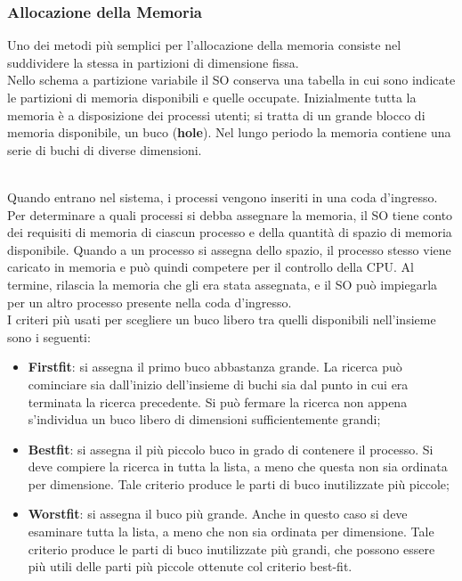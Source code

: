\documentclass{article}
\begin{document}
			\subsubsection{Allocazione della Memoria}
				Uno dei metodi più semplici per l’allocazione della memoria consiste nel suddividere la stessa in partizioni di dimensione fissa.
				\\Nello schema a partizione variabile il SO conserva una tabella in cui sono indicate le partizioni di memoria disponibili e quelle occupate. Inizialmente
				tutta la memoria è a disposizione dei processi utenti; si tratta di un grande blocco di memoria disponibile, un buco (\textbf{hole}). Nel lungo periodo la memoria contiene una serie di buchi di diverse dimensioni.
				\begin{figure}[ht!]
				\end{figure}
				\\Quando entrano nel sistema, i processi vengono inseriti in una coda d’ingresso. Per determinare a quali processi si debba assegnare la memoria, il SO tiene conto dei requisiti di memoria di ciascun processo e della quantità di spazio di
				memoria disponibile. Quando a un processo si assegna dello spazio, il processo stesso viene caricato in memoria e può quindi competere per il controllo della CPU. Al termine, rilascia la memoria che gli era stata assegnata, e il SO può impiegarla per un altro processo presente nella coda d’ingresso.
				\\I criteri più usati per scegliere un buco libero tra quelli disponibili nell’insieme sono i seguenti:
				\begin{itemize}
					\item \textbf{Firstfit}: si assegna il primo buco abbastanza grande. La ricerca può cominciare sia dall’inizio dell’insieme di buchi sia dal punto in cui era terminata la ricerca precedente. Si può fermare la ricerca non appena s’individua un buco libero di dimensioni sufficientemente grandi;
					\item \textbf{Bestfit}: si assegna il più piccolo buco in grado di contenere il processo. Si deve
					compiere la ricerca in tutta la lista, a meno che questa non sia ordinata per dimensione. Tale criterio produce le parti di buco inutilizzate più piccole;
					\item \textbf{Worstfit}: si assegna il buco più grande. Anche in questo caso si deve esaminare tutta la lista, a meno che non sia ordinata per dimensione. Tale criterio produce le	parti di buco inutilizzate più grandi, che possono essere più utili delle parti più
					piccole ottenute col criterio best-fit.
				\end{itemize}
\end{document}
